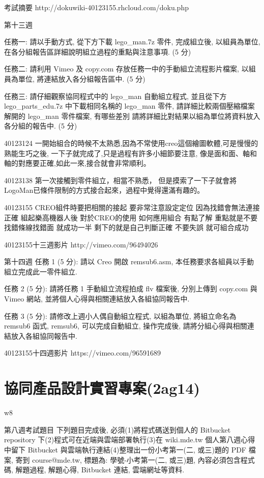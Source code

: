 \documentclass[]{article}
\begin{document}
考試摘要 http://dokuwiki-40123155.rhcloud.com/doku.php

第十三週

任務一: 請以手動方式, 從下方下載 lego\_man.7z 零件, 完成組立後,
以組員為單位, 在各分組報告區詳細說明組立過程的重點與注意事項. (5 分)

任務二: 請利用 Vimeo 及 copy.com 存放任務一中的手動組立流程影片檔案,
以組員為單位, 將連結放入各分組報告區中. (5 分)

任務三: 請仔細觀察協同程式中的 lego\_man 自動組立程式, 並且從下方
lego\_parts\_edu.7z 中下載相同名稱的 lego\_man 零件,
請詳細比較兩個壓縮檔案解開的 lego\_man 零件檔案, 有哪些差別
請將詳細比對結果以組為單位將資料放入各分組的報告中. (5 分)

40123124
一開始組合的時候不太熟悉,因為不常使用creo這個繪圖軟體,可是慢慢的熟能生巧之後,
一下子就完成了,只是過程有許多小細節要注意,
像是面和面、軸和軸的對應要正確,如此一來,接合就會非常順利。

40123138 第一次接觸到零件組立，相當不熟悉，
但是摸索了一下子就會將LogoMan已條件限制的方式接合起來，過程中覺得還滿有趣的。

40123155 CREO組件時要把相關的接起 要非常注意設定定位
因為找錯會無法連接正確 組起樂高機器人後 對於CREO的使用 如何應用組合
有點了解 重點就是不要找錯條線找錯面 就成功一半 剩下的就是自己判斷正確
不要失誤 就可組合成功

40123155十三週影片 http://vimeo.com/96494026

第十四週 任務 1 (5 分): 請以 Creo 開啟 remsub6.asm,
本任務要求各組員以手動組立完成此一零件組立.

任務 2 (5 分): 請將任務 1 手動組立流程拍成 flv 檔案後, 分別上傳到
copy.com 與 Vimeo 網站, 並將個人心得與相關連結放入各組協同報告中.

任務 3 (5 分): 請修改上週小人偶自動組立程式, 以組為單位, 將組立命名為
remsub6 函式, remsub6, 可以完成自動組立, 操作完成後,
請將分組心得與相關連結放入各組協同報告中.

40123155十四週影片 https://vimeo.com/96591689

\section{﻿協同產品設計實習專案(2ag14)}\label{ux5354ux540cux7522ux54c1ux8a2dux8a08ux5be6ux7fd2ux5c08ux68482ag14}

w8

第八週考試題目 下列題目完成後, 必須(1)將程式碼送到個人的 Bitbucket
repository 下(2)程式可在近端與雲端部署執行(3)在 wiki.mde.tw
個人第八週心得中留下 Bitbucket 與雲端執行連結(4)整理出一份小考第一(二,
或三)題的 PDF 檔案, 寄到 course@mde.tw, 標題為: 學號-小考第一(二,
或三)題, 內容必須包含程式碼, 解題過程, 解題心得, Bitbucket 連結,
雲端網址等資料.
\end{document}
